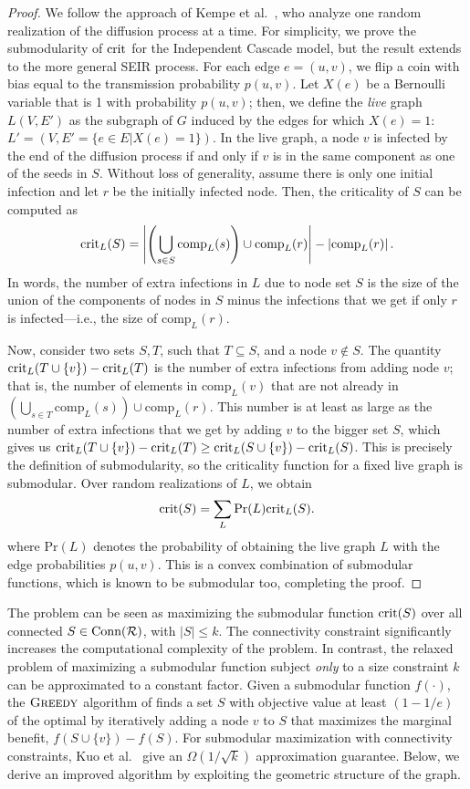 \begin{proof}
We follow the approach of Kempe et al.\ \cite{kempe:sigkdd03}, who analyze one random realization of the diffusion process at a time. For simplicity, we prove the submodularity of $\text{crit}$ for the Independent Cascade model, but the result extends to the more general SEIR process. For each edge $e=(u,v)$, we flip a coin with bias equal to the transmission probability $p(u,v)$. Let $X(e)$ be a Bernoulli variable that is 1 with probability $p(u,v)$; then, we define the \emph{live} graph $L(V, E')$ as the subgraph of $G$ induced by the edges for which $X(e) = 1$: $L' = (V, E'=\{e \in E | X(e) = 1\})$. In the live graph, a node $v$ is infected by the end of the diffusion process if and only if $v$ is in the same component as one of the seeds in $S$. Without loss of generality, assume there is only one initial infection and let $r$ be the initially infected node. Then, the criticality of $S$ can be computed as
$$
\text{crit}_L(S) = \left|\left(\bigcup_{s \in S} \text{comp}_L(s)\right) \cup \text{comp}_L(r)\right| - \left|\text{comp}_L(r)\right|.
$$
In words, the number of extra infections in $L$ due to node set $S$ is the size of the union of the components of nodes in $S$ minus the infections that we get if only $r$ is infected---i.e., the size of $\text{comp}_L(r)$.

Now, consider two sets $S,T$, such that $T\subseteq S$, and a node $v \not \in S$. The quantity $\text{crit}_L(T \cup \{v\}) - \text{crit}_L(T)$ is the number of extra infections from adding node $v$; that is, the number of elements in $\text{comp}_L(v)$ that are not already in $(\bigcup_{s \in T} \text{comp}_L(s)) \cup \text{comp}_L(r)$. This number is at least as large as the number of extra infections that we get by adding $v$ to the bigger set $S$, which gives us $\text{crit}_L(T \cup \{v\}) - \text{crit}_L(T) \geq \text{crit}_L(S \cup \{v\}) - \text{crit}_L(S)$. This is precisely the definition of submodularity, so the criticality function for a fixed live graph is submodular. Over random realizations of $L$, we obtain
$$
\text{crit}(S) = \sum_{L}\text{Pr}(L) \text{crit}_L(S).
$$
where $\text{Pr}(L)$ denotes the probability of obtaining the live graph $L$ with the edge probabilities $p(u,v)$. This is a convex combination of submodular functions, which is known to be submodular too, completing the proof.
\end{proof}

The \maxcrit{} problem can be seen as maximizing the submodular function $\text{crit}(S)$ over all connected $S\in\text{Conn}(\mathcal{R})$, with $|S|\leq k$. The connectivity constraint significantly increases the computational complexity of the problem. In contrast, the relaxed problem of maximizing a submodular function subject \emph{only} to a size constraint $k$ can be approximated to a constant factor. Given a submodular function $f(\cdot)$, the $\textsc{Greedy}{}$ algorithm of \cite{nemhauser1978analysis} finds a set $S$ with objective value at least $(1 - 1/e)$ of the optimal by iteratively adding a node $v$ to $S$ that maximizes the marginal benefit, $f(S\cup\{v\}) - f(S)$.
For submodular maximization with connectivity constraints, Kuo et al.\ \cite{kuo2015maximizing} give an $\Omega(1/\sqrt{k})$ approximation guarantee. Below, we derive an improved algorithm by exploiting the geometric structure of the graph.

